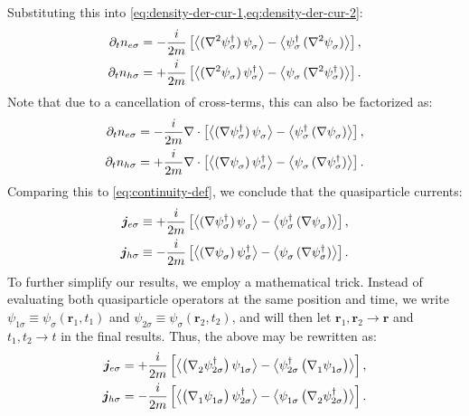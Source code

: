 Substituting this into \cref{eq:density-der-cur-1,eq:density-der-cur-2}:
\begin{align}
  \p t n_{e\sigma} &=
  -\frac{i}{2m} 
  \left[ \avg[\big]{(\nabla^2 \hc{\psi_{\sigma}})\, \pc{\psi_{\sigma}}} -
         \avg[\big]{\hc{\psi_{\sigma}}\, (\nabla^2 \pc{\psi_{\sigma}})} \right], \\
  \p t n_{h\sigma} &=
  +\frac{i}{2m} 
  \left[ \avg[\big]{(\nabla^2 \pc{\psi_{\sigma}})\, \hc{\psi_{\sigma}}} -
         \avg[\big]{\pc{\psi_{\sigma}}\, (\nabla^2 \hc{\psi_{\sigma}})} \right]. 
\end{align}
Note that due to a cancellation of cross-terms, this can also be factorized as:
\begin{align}
  \p t n_{e\sigma} &=
  -\frac{i}{2m} \nabla \cdot 
  \left[ \avg[\big]{(\nabla \hc{\psi_{\sigma}})\, \pc{\psi_{\sigma}}} -
         \avg[\big]{\hc{\psi_{\sigma}}\, (\nabla \pc{\psi_{\sigma}})} \right], \\
  \p t n_{h\sigma} &=
  +\frac{i}{2m} \nabla \cdot
  \left[ \avg[\big]{(\nabla \pc{\psi_{\sigma}})\, \hc{\psi_{\sigma}}} -
         \avg[\big]{\pc{\psi_{\sigma}}\, (\nabla \hc{\psi_{\sigma}})} \right].
\end{align}
Comparing this to \cref{eq:continuity-def}, we conclude that the quasiparticle currents:
\begin{align}
  \bm{j}_{e\sigma} &\equiv
  +\frac{i}{2m} 
  \left[ \avg[\big]{(\nabla \hc{\psi_{\sigma}})\, \pc{\psi_{\sigma}}} -
         \avg[\big]{\hc{\psi_{\sigma}}\, (\nabla \pc{\psi_{\sigma}})} \right], \\
  \bm{j}_{h\sigma} &\equiv
  -\frac{i}{2m}
  \left[ \avg[\big]{(\nabla \pc{\psi_{\sigma}})\, \hc{\psi_{\sigma}}} -
         \avg[\big]{\pc{\psi_{\sigma}}\, (\nabla \hc{\psi_{\sigma}})} \right].
\end{align}
To further simplify our results, we employ a mathematical trick.
Instead of evaluating both quasiparticle operators at the same position and time, we write $\psi_{1 \sigma} \equiv \psi_\sigma(\bm{r}_1,t_1)$ and $\psi_{2 \sigma} \equiv \psi_\sigma(\bm{r}_2,t_2)$, and will then let $\bm{r}_1,\bm{r}_2 \rightarrow \bm{r}$ and $t_1,t_2 \rightarrow t$ in the final results.
Thus, the above may be rewritten as:
\begin{align}
  \bm{j}_{e\sigma} &=
  +\frac{i}{2m} 
  \left[ \avg[\big]{\big(\pc{\nabla_2} \hc{\psi_{2 \sigma}}\big)\, \pc{\psi_{1 \sigma}}} -
  \avg[\big]{\hc{\psi_{2 \sigma}}\, \big(\pc{\nabla_1} \pc{\psi_{1 \sigma}}\big)} \right], \\
  \bm{j}_{h\sigma} &=
  -\frac{i}{2m}
  \left[ \avg[\big]{\big(\pc{\nabla_1} \pc{\psi_{1 \sigma}}\big)\, \hc{\psi_{2 \sigma}}} -
  \avg[\big]{\pc{\psi_{1 \sigma}}\, \big(\pc{\nabla_2} \hc{\psi_{2 \sigma}}\big)} \right].
\end{align}
